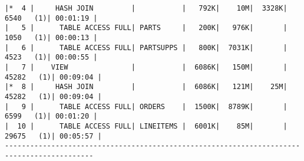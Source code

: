 \documentclass[11pt,a4paper,parskip=half]{scrartcl}
\begin{document}
\begin{lstlisting}
|*  4 |     HASH JOIN         |           |   792K|    10M|  3328K|  6540   (1)| 00:01:19 |                                                                                                                                                                                                                  
|   5 |      TABLE ACCESS FULL| PARTS     |   200K|   976K|       |  1050   (1)| 00:00:13 |                                                                                                                                                                                                                  
|   6 |      TABLE ACCESS FULL| PARTSUPPS |   800K|  7031K|       |  4523   (1)| 00:00:55 |                                                                                                                                                                                                                  
|   7 |    VIEW               |           |  6086K|   150M|       | 45282   (1)| 00:09:04 |                                                                                                                                                                                                                  
|*  8 |     HASH JOIN         |           |  6086K|   121M|    25M| 45282   (1)| 00:09:04 |                                                                                                                                                                                                                  
|   9 |      TABLE ACCESS FULL| ORDERS    |  1500K|  8789K|       |  6599   (1)| 00:01:20 |                                                                                                                                                                                                                  
|  10 |      TABLE ACCESS FULL| LINEITEMS |  6001K|    85M|       | 29675   (1)| 00:05:57 |                                                                                                                                                                                                                  
-------------------------------------------------------------------------------------------                                                                                                                                                                                                                  
                                                                                                                                                                                                                                                                                                             

\end{lstlisting}
\end{document}
